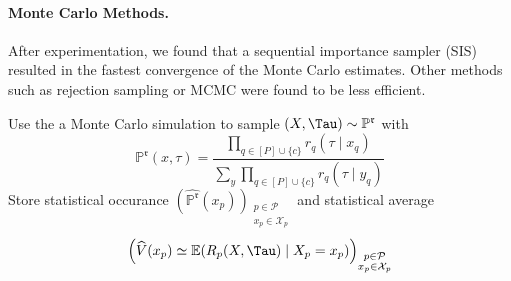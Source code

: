 \documentclass[12pt, a4paper]{article}
\begin{document}
\paragraph{Monte Carlo Methods.}
After experimentation, we found that a sequential importance sampler (SIS) resulted in the fastest convergence of the Monte Carlo estimates.
Other methods such as rejection sampling or MCMC were found to be less efficient.

\begin{algorithm}[H]
\caption{$(\widehat{\mathbb{P}^\mathfrak{r}},\widehat{V})\gets$~\texttt{PreTerminalMC}$(\mathfrak r)$}
\label{alg:mc-preterminal}
\DontPrintSemicolon
{}
  Use the a Monte Carlo simulation to sample $(X,\Tau) \sim \mathbb{P}^\mathfrak{r}$ with
  \[
    \mathbb{P}^\mathfrak{r}(x,\tau) = \frac{\prod_{q \in [P] \cup \{c\}} r_q(\tau \mid x_q)}{\sum_y \prod_{q \in [P] \cup \{c\}} r_q(\tau \mid y_q)}
  \]\;
  Store statistical occurance $(\widehat{\mathbb{P}^\mathfrak{r}}(x_p))_{\substack{p \in \mathcal{P} \\ x_p \in \mathcal{X}_p}}$ and statistical average
  \[
    \left(\widehat{V}(x_p) \simeq \mathbb{E}(R_p(X,\Tau) \mid X_p = x_p)\right)_{\substack{p \in \mathcal{P} \\ x_p \in \mathcal{X}_p}}
  \]
\end{algorithm}
\end{document}
